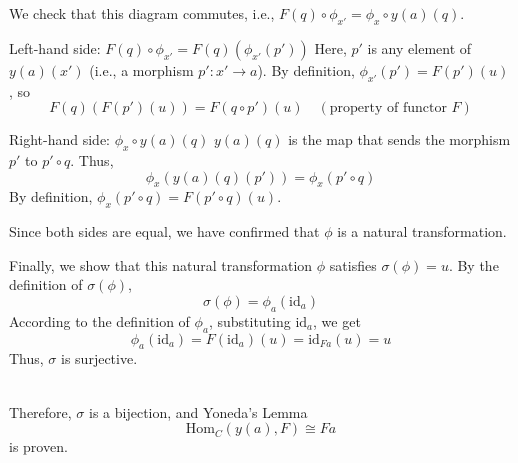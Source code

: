 \documentclass[uplatex,a4j,12pt,dvipdfmx]{jsarticle}
\begin{document}
We check that this diagram commutes, i.e., $F(q) \circ \phi_{x'} = \phi_x \circ y(a)(q)$.

Left-hand side: $F(q) \circ \phi_{x'} = F(q)(\phi_{x'}(p'))$
Here, $p'$ is any element of $y(a)(x')$ (i.e., a morphism $p': x' \to a$).
By definition, $\phi_{x'}(p') = F(p')(u)$, so
$$ F(q)(F(p')(u)) = F(q \circ p')(u) \quad (\text{property of functor } F) $$

Right-hand side: $\phi_x \circ y(a)(q)$
$y(a)(q)$ is the map that sends the morphism $p'$ to $p' \circ q$.
Thus,
$$ \phi_x(y(a)(q)(p')) = \phi_x(p' \circ q) $$
By definition, $\phi_x(p' \circ q) = F(p' \circ q)(u)$.

Since both sides are equal, we have confirmed that $\phi$ is a natural transformation.

Finally, we show that this natural transformation $\phi$ satisfies $\sigma(\phi) = u$.
By the definition of $\sigma(\phi)$,
$$ \sigma(\phi) = \phi_a(\text{id}_a) $$
According to the definition of $\phi_a$, substituting $\text{id}_a$, we get
$$ \phi_a(\text{id}_a) = F(\text{id}_a)(u) = \text{id}_{Fa}(u) = u $$
Thus, $\sigma$ is surjective.

\ \\

Therefore, $\sigma$ is a bijection, and
Yoneda's Lemma
\[
	\text{Hom}_{C}(y(a),F) \cong Fa
\]
is proven.
\end{document}
